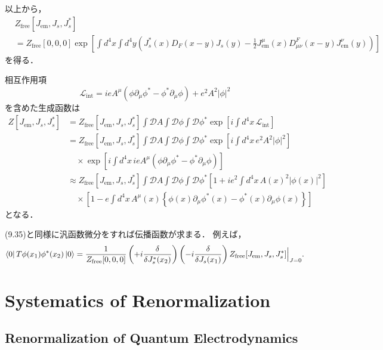 以上から，
\begin{align*}
  & Z_\text{free}[J_\text{em}, J_s, J_s^\ast] \\
  &= Z_\text{free}[0, 0, 0] \exp \left[ \int d^4x \int d^4 y \left( J_s^\ast(x) D_F(x-y) J_s(y) - \frac{1}{2} J_\text{em}^\mu(x) D_{\mu\nu}^F (x-y) J_\text{em}^\nu (y) \right) \right]
\end{align*}
を得る．

相互作用項
\[ \mathcal{L}_\text{int} = ieA^\mu (\phi \partial_\mu \phi^\ast - \phi^\ast \partial_\mu \phi) + e^2A^2 \lvert \phi \rvert^2 \]
を含めた生成函数は
\begin{align*}
  Z[J_\text{em}, J_s, J_s^\ast] &= Z_\text{free}[J_\text{em}, J_s, J_s^\ast] \int \mathcal{D} A \int \mathcal{D} \phi \int \mathcal{D} \phi^\ast \exp \left[ i \int d^4x \, \mathcal{L}_\text{int} \right] \\
  &= Z_\text{free}[J_\text{em}, J_s, J_s^\ast] \int \mathcal{D} A \int \mathcal{D} \phi \int \mathcal{D} \phi^\ast
  \exp \left[ i \int d^4x \, e^2A^2 \lvert \phi \rvert^2 \right] \\
  & \quad \times \exp \left[ i \int d^4x \, ieA^\mu (\phi \partial_\mu \phi^\ast - \phi^\ast \partial_\mu \phi) \right] \\
  &\approx Z_\text{free}[J_\text{em}, J_s, J_s^\ast] \int \mathcal{D} A \int \mathcal{D} \phi \int \mathcal{D} \phi^\ast
  \left[ 1 + i e^2 \int d^4x \, A(x)^2 \lvert \phi(x) \rvert^2 \right] \\
  & \quad \times \left[1 - e \int d^4x \, A^\mu(x) \left\{ \phi(x) \partial_\mu \phi^\ast(x) - \phi^\ast(x) \partial_\mu \phi(x) \right\} \right]
\end{align*}
となる．

(9.35)と同様に汎函数微分をすれば伝播函数が求まる．
例えば，
\[
\bra{0} T \phi(x_1) \phi^\ast(x_2) \ket{0} =
\frac{1}{Z_\text{free}[0, 0, 0]} \left( + i\frac{\delta}{\delta J_s^\ast(x_2)} \right)
\left( - i\frac{\delta}{\delta J_s(x_1)} \right) Z_\text{free}[J_\text{em}, J_s, J_s^\ast] \Bigl{|}_{J=0} .
\]

\chapter{Systematics of Renormalization}
\setcounter{section}{2}
\section{Renormalization of Quantum Electrodynamics}
